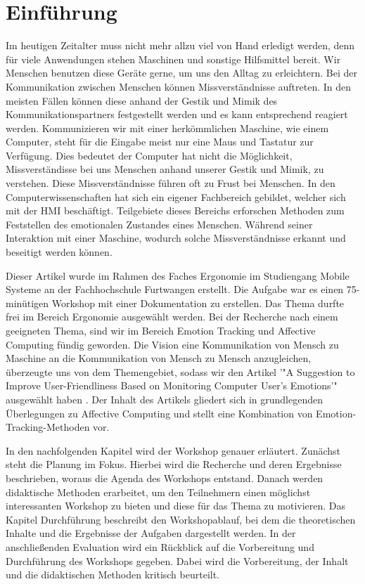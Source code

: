 \section{Einführung}
Im heutigen Zeitalter muss nicht mehr allzu viel von Hand erledigt werden, denn für viele Anwendungen stehen Maschinen und sonstige Hilfsmittel bereit. Wir Menschen benutzen diese Geräte gerne, um uns den Alltag zu erleichtern. Bei der Kommunikation zwischen Menschen können Missverständnisse auftreten. In den meisten Fällen können diese anhand der Gestik und Mimik des Kommunikationspartners festgestellt werden und es kann entsprechend reagiert werden. Kommunizieren wir mit einer herkömmlichen Maschine, wie einem Computer, steht für die Eingabe meist nur eine Maus und Tastatur zur Verfügung. Dies bedeutet der Computer hat nicht die Möglichkeit, Missverständisse bei uns Menschen anhand unserer Gestik und Mimik, zu verstehen. Diese Missverständnisse führen oft zu Frust bei Menschen. In den Computerwissenschaften hat sich ein eigener Fachbereich gebildet, welcher sich mit der \ac{HMI} beschäftigt. Teilgebiete dieses Bereichs erforschen Methoden zum Feststellen des emotionalen Zustandes eines Menschen. Während seiner Interaktion mit einer Maschine, wodurch solche Missverständnisse erkannt und beseitigt werden können.

Dieser Artikel wurde im Rahmen des Faches Ergonomie im Studiengang Mobile Systeme an der Fachhochschule Furtwangen erstellt. Die Aufgabe war es einen 75-minütigen Workshop mit einer Dokumentation zu erstellen. Das Thema durfte frei im Bereich Ergonomie ausgewählt werden. Bei der Recherche nach einem geeigneten Thema, sind wir im Bereich Emotion Tracking und Affective Computing fündig geworden. Die Vision eine Kommunikation von Mensch zu Maschine an die Kommunikation von Mensch zu Mensch anzugleichen, überzeugte uns von dem Themengebiet, sodass wir den Artikel '"A Suggestion to Improve User-Friendliness Based on Monitoring Computer User’s Emotions'" ausgewählt haben \cite{EmotionTrackingGSR}. Der Inhalt des Artikels gliedert sich in grundlegenden Überlegungen zu Affective Computing und stellt eine Kombination von Emotion-Tracking-Methoden vor.

In den nachfolgenden Kapitel wird der Workshop genauer erläutert. Zunächst steht die Planung im Fokus. Hierbei wird die Recherche und deren Ergebnisse beschrieben, woraus die Agenda des Workshops entstand. Danach werden didaktische Methoden erarbeitet, um den Teilnehmern einen möglichst interessanten Workshop zu bieten und diese für das Thema zu motivieren. Das Kapitel Durchführung beschreibt den Workshopablauf, bei dem die theoretischen Inhalte und die Ergebnisse der Aufgaben dargestellt werden. In der anschließenden Evaluation wird ein Rückblick auf die Vorbereitung und Durchführung des Workshops gegeben. Dabei wird die Vorbereitung, der Inhalt und die didaktischen Methoden kritisch beurteilt.
